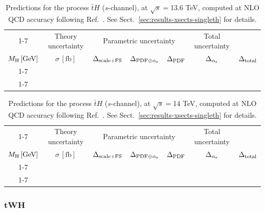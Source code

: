 \begin{table}[ht!]
\caption{\label{tab:th-s-atop136} Predictions for the process $\bar tH$ ($s$-channel), at $\sqrt{s}=$13.6 TeV, computed at NLO QCD accuracy following Ref.~\cite{Demartin:2015uha}. See Sect.~\ref{sec:results-xsects-singleth} for details.}
\centering
\scriptsize
{\renewcommand{\arraystretch}{1.4}
\begin{tabular}{| cc | c | ccc | c |}
\cline{1-7}
\multicolumn{2}{|c|}{\(\sqrt{s} = 13.6\,\mathrm{TeV}\)} &
\multicolumn{1}{|c|}{Theory uncertainty} &
\multicolumn{3}{|c|}{Parametric uncertainty} &
\multicolumn{1}{c|}{Total uncertainty} \\
\(M_\mathrm{H}\,[\mathrm{GeV}]\) & \(\sigma\,[\mathrm{fb}]\) &
\(\Delta_{\rm scale+\textrm{FS}}\) &
\(\Delta_{{\rm PDF}\oplus\alpha_{\mathrm{s}}}\) &
{\color{black!55}\(\Delta_{\rm PDF}\)} & {\color{black!55}\(\Delta_{\alpha_{\mathrm{s}}}\)} &
\(\Delta_{\rm total}\)
\\
\cline{1-7}
 \\
\cline{1-7}
\end{tabular}
}
\end{table}

\begin{table}[ht!]
\caption{\label{tab:th-s-atop14} Predictions for the process $\bar tH$ ($s$-channel), at $\sqrt{s}=$14 TeV, computed at NLO QCD accuracy following Ref.~\cite{Demartin:2015uha}. See Sect.~\ref{sec:results-xsects-singleth} for details.}
\centering
\scriptsize
{\renewcommand{\arraystretch}{1.4}
\begin{tabular}{| cc | c | ccc | c |}
\cline{1-7}
\multicolumn{2}{|c|}{\(\sqrt{s} = 14\,\mathrm{TeV}\)} &
\multicolumn{1}{|c|}{Theory uncertainty} &
\multicolumn{3}{|c|}{Parametric uncertainty} &
\multicolumn{1}{c|}{Total uncertainty} \\
\(M_\mathrm{H}\,[\mathrm{GeV}]\) & \(\sigma\,[\mathrm{fb}]\) &
\(\Delta_{\rm scale+\textrm{FS}}\) &
\(\Delta_{{\rm PDF}\oplus\alpha_{\mathrm{s}}}\) &
{\color{black!55}\(\Delta_{\rm PDF}\)} & {\color{black!55}\(\Delta_{\alpha_{\mathrm{s}}}\)} &
\(\Delta_{\rm total}\)
\\
\cline{1-7}
 \\
\cline{1-7}
\end{tabular}
}
\end{table}


\FloatBarrier
\subsubsection{\texorpdfstring{$\boldsymbol{tWH}$}{tWH}}

